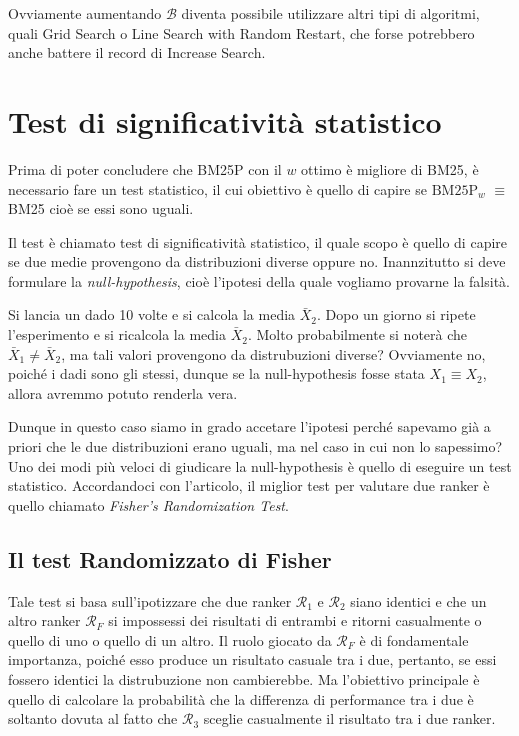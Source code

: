 Ovviamente aumentando $\mathcal{B}$ diventa possibile utilizzare altri
tipi di algoritmi, quali Grid Search o Line Search with Random Restart, che
forse potrebbero anche battere il record di Increase Search.

\section{Test di significatività statistico}

Prima di poter concludere che BM25P con il $w$ ottimo è migliore di BM25, è necessario
fare un test statistico, il cui obiettivo è quello di capire se $\text{BM25P}_w$ $\equiv$ BM25
cioè se essi sono uguali.

Il test è chiamato test di significatività statistico, il quale scopo
è quello di capire se due medie provengono da distribuzioni diverse oppure no.
Inannzitutto si deve formulare la \textit{null-hypothesis}, cioè l'ipotesi
della quale vogliamo provarne la falsità.

\begin{esempio}
	Si lancia un dado 10 volte e si calcola la media $\bar{X}_2$. Dopo un giorno si ripete l'esperimento
	e si ricalcola la media $\bar{X}_2$. Molto probabilmente si noterà che $\bar{X}_1 \neq \bar{X}_2$,
	ma tali valori provengono da distrubuzioni diverse?
	Ovviamente no, poiché i dadi sono gli stessi, dunque se la null-hypothesis fosse
	stata $X_1 \equiv X_2$, allora avremmo potuto renderla vera.
\end{esempio}

Dunque in questo caso siamo in grado accetare l'ipotesi perché
sapevamo già a priori che le due distribuzioni erano uguali, ma nel caso
in cui non lo sapessimo?
Uno dei modi più veloci di giudicare la null-hypothesis è quello di eseguire un test statistico.
Accordandoci con l'articolo\cite{10.1145/1321440.1321528}, il miglior test per valutare
due ranker è quello chiamato \textit{Fisher's Randomization Test}.

\subsection{Il test Randomizzato di Fisher}
Tale test si basa sull'ipotizzare che due ranker $\mathcal{R}_1 $ e $\mathcal{R}_2$ siano identici
e che un altro ranker $\mathcal{R}_F$ si impossessi dei risultati di entrambi e
ritorni casualmente o quello di uno o quello di un altro.
Il ruolo giocato da $\mathcal{R}_F$ è di fondamentale importanza, poiché esso produce un risultato
casuale tra i due, pertanto, se essi fossero identici la distrubuzione non cambierebbe.
Ma l'obiettivo principale è quello di calcolare la probabilità che la differenza
di performance tra i due è soltanto dovuta al fatto che $\mathcal{R}_3$ sceglie casualmente
il risultato tra i due ranker.

